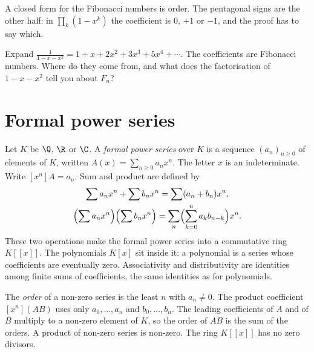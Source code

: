 A closed form for the Fibonacci numbers is order. The pentagonal signs are the other half: in $\prod_k(1-x^k)$ the coefficient is $0$, $+1$ or $-1$, and the proof has to say which.

\begin{think}
Expand $\frac1{1-x-x^2}=1+x+2x^2+3x^3+5x^4+\cdots$. The coefficients are Fibonacci numbers. Where do they come from, and what does the factorisation of $1-x-x^2$ tell you about $F_n$?
\end{think}

\section{Formal power series}

Let $K$ be $\Q$, $\R$ or $\C$. A \emph{formal power series} over $K$ is a sequence $(a_n)_{n\ge0}$ of elements of $K$, written $A(x)=\sum_{n\ge0}a_nx^n$. The letter $x$ is an indeterminate. Write $[x^n]A=a_n$. Sum and product are defined by
\[
\begin{gathered}\sum a_nx^n+\sum b_nx^n=\sum(a_n+b_n)x^n,\\\Bigl(\sum a_nx^n\Bigr)\Bigl(\sum b_nx^n\Bigr)=\sum_n\Bigl(\sum_{k=0}^na_kb_{n-k}\Bigr)x^n.\end{gathered}
\]
These two operations make the formal power series into a commutative ring $K[[x]]$. The polynomials $K[x]$ sit inside it: a polynomial is a series whose coefficients are eventually zero. Associativity and distributivity are identities among finite sums of coefficients, the same identities as for polynomials.

The \emph{order} of a non-zero series is the least $n$ with $a_n\ne0$. The product coefficient $[x^n](AB)$ uses only $a_0,\dots,a_n$ and $b_0,\dots,b_n$. The leading coefficients of $A$ and of $B$ multiply to a non-zero element of $K$, so the order of $AB$ is the sum of the orders. A product of non-zero series is non-zero. The ring $K[[x]]$ has no zero divisors.

